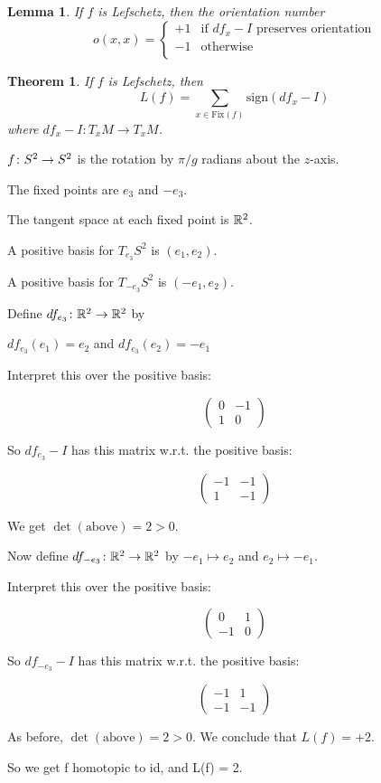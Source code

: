\documentclass[11pt]{amsbook}
\theoremstyle{mystyle} %
\newtheorem{thrm}[thm]{Theorem}
\newtheorem{lemm}[thm]{Lemma}
\numberwithin{thm}{section}
\newcommand{\Fix}{\text{Fix}}
\begin{document}
\begin{lemm}
	If $f$ is Lefschetz, then the orientation number
	$$o(x,x) =
	\begin{cases}
		+1 &\text{if $df_x - I$ preserves orientation} \\
		-1 &\text{otherwise} \\
	\end{cases}$$
\end{lemm}
\begin{thrm}
	If $f$ is Lefschetz, then $$L(f) = \sum_{x \in \Fix(f)} \text{sign}(df_x - I)$$ where $df_x - I : T_xM \overset{~}{\to} T_xM$.
\end{thrm}
\begin{example}
	$f \colon S^2 \to S^2$ is the rotation by $\pi/g$ radians about the $z$-axis.

	The fixed points are $e_3$ and $-e_3$.

	The tangent space at each fixed point is ${\mathbb R}^2$.

	A positive basis for $T_{e_3}S^2$ is $(e_1, e_2)$.

	A positive basis for $T_{-e_3}S^2$ is $(-e_1, e_2)$.

	Define $df_{e_3} \colon {\mathbb R}^2 \to {\mathbb R}^2$ by

	$df_{e_3}(e_1) = e_2$ and $df_{e_3}(e_2) = -e_1$

	Interpret this over the positive basis:

	$$\begin{pmatrix}
	0 & -1 \\
	1 & 0
	\end{pmatrix}$$

	So $df_{e_3} - I$ has this matrix w.r.t. the positive basis:

	$$\begin{pmatrix}
	-1 & -1 \\
	1 & -1
	\end{pmatrix}$$

	We get $\det(\text{above}) = 2 > 0$.

	Now define $df_{-e_3} \colon {\mathbb R}^2 \to {\mathbb R}^2$ by
	$-e_1 \mapsto e_2$ and
	$e_2 \mapsto -e_1$.

	Interpret this over the positive basis:

	$$\begin{pmatrix}
	0 & 1 \\
	-1 & 0
	\end{pmatrix}$$

	So $df_{-e_3} - I$ has this matrix w.r.t. the positive basis:

	$$\begin{pmatrix}
	-1 & 1 \\
	-1 & -1
	\end{pmatrix}$$

	As before, $\det(\text{above}) = 2 > 0$. We conclude that $L(f) = +2$.

	So we get f homotopic to id, and L(f) = 2.
\end{example}
\end{document}
